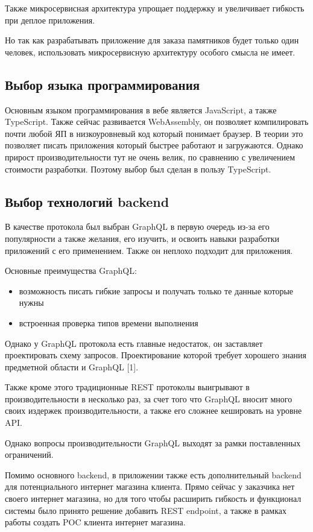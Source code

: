 \documentclass[a4paper,article,14pt]{extarticle}
\begin{document}
Также микросервисная архитектура упрощает поддержку и увеличивает гибкость при деплое приложения.

Но так как разрабатывать приложение для заказа памятников будет только один человек, использовать микросервисную архитектуру особого смысла не имеет.

\subsection{Выбор языка программирования}

Основным языком программирования в вебе является JavaScript, а также TypeScript. 
Также сейчас развивается WebAssembly, он позволяет компилировать почти любой ЯП в низкоуровневый код который понимает браузер.
В теории это позволяет писать приложения который быстрее работают и загружаются. Однако прирост производительности тут не очень велик, 
по сравнению с увеличением стоимости разработки. Поэтому выбор был сделан в пользу TypeScript.

\subsection{Выбор технологий backend}

В качестве протокола был выбран GraphQL в первую очередь из-за его популярности а также желания,
его изучить, и освоить навыки разработки приложений с его применением. Также он неплохо подходит для приложения.

Основные преимущества GraphQL:

\begin{itemize}
    \item возможность писать гибкие запросы и получать только те данные которые нужны
    \item встроенная проверка типов времени выполнения
\end{itemize}

Однако у GraphQL протокола есть главные недостаток, он заставляет проектировать схему запросов.
Проектирование которой требует хорошего знания предметной области и GraphQL [1]. 

Также кроме этого традиционные REST протоколы выигрывают в производительности в несколько раз, за счет того что 
GraphQL вносит много своих издержек производительности, а также его сложнее кешировать на уровне API. 

Однако вопросы производительности GraphQL выходят за рамки поставленных ограничений.

Помимо основного backend, в приложении также есть дополнительный backend для потенциального интернет магазина клиента.
Прямо сейчас у заказчика нет своего интернет магазина, но для того чтобы расширить гибкость и функционал системы было принято решение
добавить REST endpoint, а также в рамках работы создать POC клиента интернет магазина.
\end{document}
